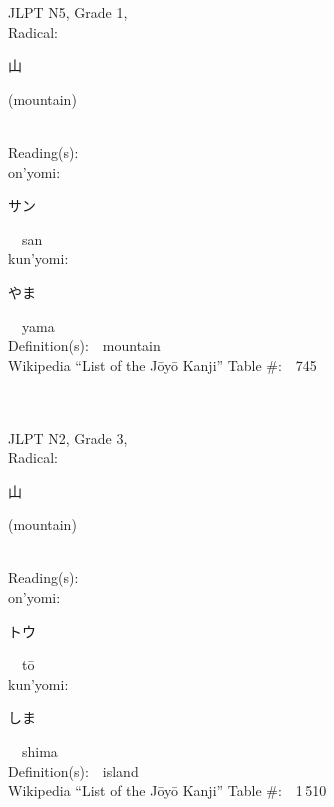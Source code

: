 \begin{multicols}{2}
{JLPT N5, Grade 1, \\Radical:\ \ {\begin{CJK}{UTF8}{min} 山 \end{CJK}} (mountain) } \\
Reading(s):\ \ \\
{\hspace*{1em}}on'yomi:\ \ \\
{\hspace*{2em}}{\begin{CJK}{UTF8}{min} サン \end{CJK}}\ \ san\ \ \\
{\hspace*{1em}}kun'yomi:\ \ \\
{\hspace*{2em}}{\begin{CJK}{UTF8}{min} やま \end{CJK}}\ \ yama\ \ \\
Definition(s):\ \ mountain \\
Wikipedia ``List of the J\=oy\=o Kanji'' Table \#:\ \ 745 \\
\ \ \\
{\fontsize{34pt}{40pt}  }\ \ \\  %
{JLPT N2, Grade 3, \\Radical:\ \ {\begin{CJK}{UTF8}{min} 山 \end{CJK}} (mountain) } \\
Reading(s):\ \ \\
{\hspace*{1em}}on'yomi:\ \ \\
{\hspace*{2em}}{\begin{CJK}{UTF8}{min} トウ \end{CJK}}\ \ t\=o\ \ \\
{\hspace*{1em}}kun'yomi:\ \ \\
{\hspace*{2em}}{\begin{CJK}{UTF8}{min} しま \end{CJK}}\ \ shima\ \ \\
Definition(s):\ \ island \\
Wikipedia ``List of the J\=oy\=o Kanji'' Table \#:\ \ 1\,510 \\
\ \ \\
\end{multicols}


